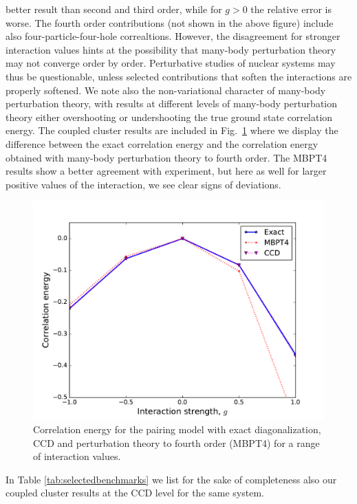   better result than second and third order, while for $g>0$ the
  relative error is worse.  The fourth order contributions (not shown in the above figure) include also four-particle-four-hole correaltions.
However, the disagreement for stronger interaction values hints at  the possibility that many-body perturbation theory may not converge order by order.  Perturbative studies of nuclear systems may thus be questionable, unless selected contributions that soften the interactions are properly softened.   
 We note also the non-variational character
  of many-body perturbation theory, with results at different levels of many-body perturbation theory either
  overshooting or undershooting the true ground state correlation energy. 
The coupled cluster results are included in Fig.~\ref{fig:pairingccmbpt4} where we display the difference between the exact correlation energy and the correlation energy obtained with many-body perturbation theory to fourth order.  The MBPT4 results show a better agreement with experiment, but here as well for larger positive values of the interaction, we see clear signs of deviations. 
  \begin{figure}
    \includegraphics[width=\linewidth]{Chapter8-figures/CCDMBPT4theory.pdf}
    \caption{Correlation energy for the pairing model with exact diagonalization, CCD and perturbation theory to fourth order (MBPT4) for a range of interaction values.}
    \label{fig:pairingccmbpt4}
  \end{figure}
In Table \ref{tab:selectedbenchmarks} we list for the sake of completeness also our coupled cluster results at the CCD level for the same system.
